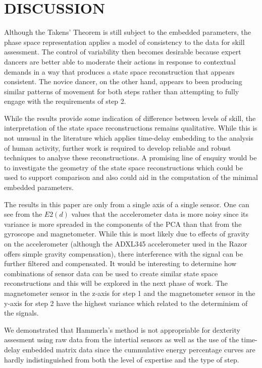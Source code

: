 \documentclass{sigchi}
\begin{document}
\section{DISCUSSION}
Although the Takens' Theorem is still subject to the embedded parameters, 
the phase space representation applies a model of consistency to the data for skill assessment. 
The control of variability then becomes desirable because expert dancers are better able to moderate 
their actions in response to contextual demands in a way that produces a state space reconstruction 
that appears consistent.  The novice dancer, on the other hand, appears to been producing similar 
patterns of movement for both steps rather than attempting to fully engage with the requirements of step 2.  

While the results provide some indication of difference between levels of skill, the interpretation of 
the state space reconstructions remains qualitative.  While this is not unusual in the literature
which applies time-delay embedding to the analysis of human activity, further work is required to develop 
reliable and robust techniques to analyse these reconstructions.  
A promising line of enquiry would be to investigate the geometry of the state space reconstructions
which could be used to support comparison \cite{Sama2013} and also could aid in the computation of the minimal 
embedded parameters. 
 
The results in this paper are only from a single axis of a single sensor. 
One can see from the $E2(d)$ values that the accelerometer data is more noisy since its variance is 
more spreaded in the components of the PCA than that from the gyroscope and magnetometer.  
While this is most likely due to effects of gravity on the accelerometer 
(although the ADXL345 accelerometer used in the Razor offers simple gravity compensation), 
there interference with the signal can be further filtered and compensated.  
It would be interesting to determine how combinations of sensor data can be used to create similar 
state space reconstructions and this will be explored in the next phase of work. 
The magnetometer sensor in the z-axis for step 1 and the magnetometer sensor in the y-axis for step 2
have the highest variance which related to the determinism of the signals.

We demonstrated that Hammerla's method is not appropriable for dexterity assesment using 
raw data from the intertial sensors as well as the use of the time-delay embedded matrix data
since the cummulative energy percentage curves are hardly indistinguished from 
both the level of expertise and the type of step.
\end{document}
